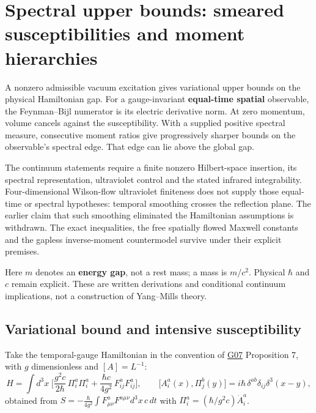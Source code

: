 \documentclass[11pt,a4paper]{article}
\begin{document}
\hypertarget{spectral-upper-bounds-smeared-susceptibilities-and-moment-hierarchies}{%
\section{Spectral upper bounds: smeared susceptibilities and moment
hierarchies}\label{spectral-upper-bounds-smeared-susceptibilities-and-moment-hierarchies}}

A nonzero admissible vacuum excitation gives variational upper bounds on
the physical Hamiltonian gap. For a gauge-invariant \textbf{equal-time
spatial} observable, the Feynman--Bijl numerator is its electric
derivative norm. At zero momentum, volume cancels against the
susceptibility. With a supplied positive spectral measure, consecutive
moment ratios give progressively sharper bounds on the observable's
spectral edge. That edge can lie above the global gap.

The continuum statements require a finite nonzero Hilbert-space
insertion, its spectral representation, ultraviolet control and the
stated infrared integrability. Four-dimensional Wilson-flow ultraviolet
finiteness does not supply those equal-time or spectral hypotheses:
temporal smoothing crosses the reflection plane. The earlier claim that
such smoothing eliminated the Hamiltonian assumptions is withdrawn. The
exact inequalities, the free spatially flowed Maxwell constants and the
gapless inverse-moment countermodel survive under their explicit
premises.

Here \(m\) denotes an \textbf{energy gap}, not a rest mass; a mass is
\(m/c^2\). Physical \(\hbar\) and \(c\) remain explicit. These are
written derivations and conditional continuum implications, not a
construction of Yang--Mills theory.

\hypertarget{variational-bound-and-intensive-susceptibility}{%
\subsection{Variational bound and intensive
susceptibility}\label{variational-bound-and-intensive-susceptibility}}

Take the temporal-gauge Hamiltonian in the convention of
\href{low-dimensional-mass-gap.md}{G07} Proposition 7, with \(g\)
dimensionless and \([A]=L^{-1}\):
\[H=\int d^3x\;\Big[\frac{g^2c}{2\hbar}\,\Pi^a_i\Pi^a_i
+\frac{\hbar c}{4g^2}\,F^a_{ij}F^a_{ij}\Big],
\qquad\big[A^a_i(x),\Pi^b_j(y)\big]=i\hbar\,\delta^{ab}\delta_{ij}\delta^3(x-y),\]
obtained from
\(S=-\frac{\hbar}{4g^2}\int F^a_{\mu\nu}F^{a\mu\nu}d^3x\,c\,dt\) with
\(\Pi^a_i=(\hbar/g^2c)\dot A^a_i\).
\end{document}
